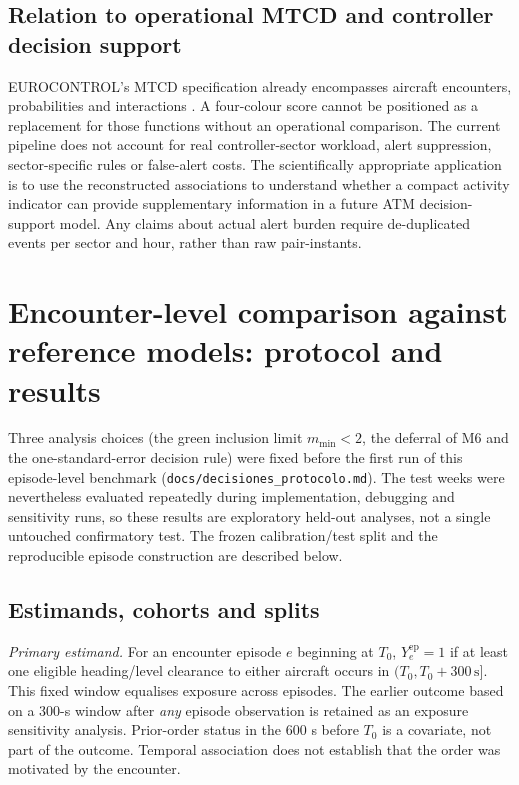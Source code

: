 \documentclass[pdflatex,sn-mathphys-num]{sn-jnl}
\newcommand{\mmin}{m_{\min}}
\begin{document}
\subsection{Relation to operational MTCD and controller decision support}
EUROCONTROL's MTCD specification already encompasses aircraft encounters, probabilities and interactions \cite{eurocontrol2017}. A four-colour score cannot be positioned as a replacement for those functions without an operational comparison. The current pipeline does not account for real controller-sector workload, alert suppression, sector-specific rules or false-alert costs. The scientifically appropriate application is to use the reconstructed associations to understand whether a compact activity indicator can provide supplementary information in a future ATM decision-support model. Any claims about actual alert burden require de-duplicated events per sector and hour, rather than raw pair-instants.

\section{Encounter-level comparison against reference models: protocol and results}\label{sec:benchmarks}
Three analysis choices (the green inclusion limit $\mmin<2$, the deferral of M6 and the one-standard-error decision rule) were fixed before the first run of this episode-level benchmark (\texttt{docs/decisiones\_protocolo.md}). The test weeks were nevertheless evaluated repeatedly during implementation, debugging and sensitivity runs, so these results are exploratory held-out analyses, not a single untouched confirmatory test. The frozen calibration/test split and the reproducible episode construction are described below.

\subsection{Estimands, cohorts and splits}
\emph{Primary estimand.} For an encounter episode $e$ beginning at $T_0$, $Y^{\mathrm{ep}}_e=1$ if at least one eligible heading/level clearance to either aircraft occurs in $(T_0,T_0+300\,\mathrm{s}]$. This fixed window equalises exposure across episodes. The earlier outcome based on a 300-s window after \emph{any} episode observation is retained as an exposure sensitivity analysis. Prior-order status in the 600 s before $T_0$ is a covariate, not part of the outcome. Temporal association does not establish that the order was motivated by the encounter.
\end{document}
